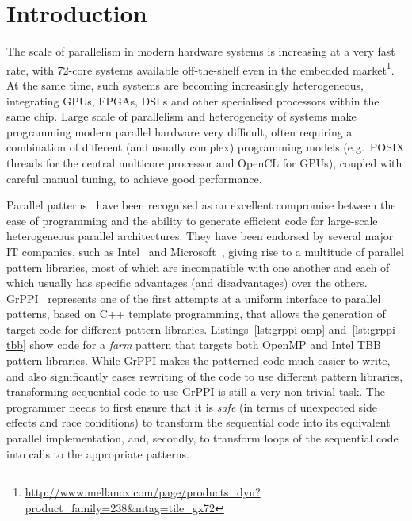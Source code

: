 \section{Introduction}
\label{intro}

\noindent
The scale of parallelism in modern hardware systems is increasing at a very fast rate, with 72-core systems available off-the-shelf even in the embedded market\footnote{\url{http://www.mellanox.com/page/products_dyn?product_family=238&mtag=tile_gx72}}. At the same time, such systems are becoming increasingly heterogeneous, integrating GPUs, FPGAs, DSLs and other specialised processors within the same chip. Large scale of parallelism and heterogeneity of systems make programming modern parallel hardware very difficult, often requiring a combination of different (and usually complex) programming models (e.g.~POSIX threads for the central multicore processor and OpenCL for GPUs), coupled with careful manual tuning, to achieve good performance. 

Parallel patterns~\cite{Asanovic:2009:VPC} have been recognised as an excellent compromise between the ease of programming and the ability to generate efficient code for large-scale heterogeneous parallel architectures. They have been endorsed by several major IT companies, such as Intel~\cite{DBLP:reference/parallel/X11pz} and Microsoft~\cite{ACM:book/msoft/CampbellM11}, giving rise to a multitude of parallel pattern libraries, most of which are incompatible with one another and each of which usually has specific advantages (and disadvantages) over the others. GrPPI~\cite{DBLP:journals/concurrency/AstorgaD0G17} represents one of the first attempts at a uniform interface to parallel patterns, based on C++ template programming, that allows the generation of target code for different pattern libraries. Listings~\ref{lst:grppi-omp} and~\ref{lst:grppi-tbb} show code for a \emph{farm} pattern that targets both OpenMP and Intel TBB pattern libraries. While GrPPI makes the patterned code much easier to write, and also significantly eases rewriting of the code to use different pattern libraries, transforming sequential code to use GrPPI is still a very non-trivial task. The programmer needs to first ensure that it is \emph{safe} (in terms of unexpected side effects and race conditions) to transform the sequential code into its equivalent parallel implementation, and, secondly, to transform loops of the sequential code into calls to the appropriate patterns. 

